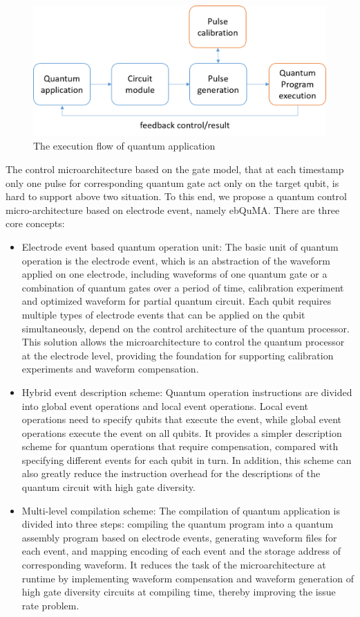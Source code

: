 \begin{figure}[ht]
  \centering
  \includegraphics[width=\linewidth]{figure/1}
  \caption{The execution flow of quantum application}
  \label{img}
\end{figure}

The control microarchitecture based on the gate model, that at each timestamp only one pulse for corresponding 
quantum gate act only on the target qubit, is hard to support above two situation. To this end, we propose a quantum control 
micro-architecture based on electrode event, namely ebQuMA. There are three core concepts:
\begin{itemize}
  \item Electrode event based quantum operation unit: The basic unit of quantum operation is the electrode event, which is an abstraction of the waveform applied on one electrode, 
  including waveforms of one quantum gate or a combination of quantum gates over a period of time, 
  calibration experiment and optimized waveform for partial quantum circuit. 
  Each qubit requires multiple types of electrode events that can be applied on the qubit simultaneously, depend on the control architecture of the quantum processor. 
  This solution allows the microarchitecture to control the quantum processor at the electrode level, providing the foundation for supporting calibration experiments and waveform compensation. 
  \item Hybrid event description scheme: Quantum operation instructions are divided into global event 
  operations and local event operations. Local event operations need to specify qubits that execute the event, while global 
  event operations execute the event on all qubits. It provides a simpler description scheme for quantum operations that 
  require compensation, compared with specifying different events for each qubit in turn. In addition, this scheme can 
  also greatly reduce the instruction overhead for the descriptions of the quantum circuit with high gate diversity.
  \item Multi-level compilation scheme: The compilation of quantum application is divided into three steps: compiling 
  the quantum program into a quantum assembly program based on electrode events, generating waveform files for each event, 
  and mapping encoding of each event and the storage address of corresponding waveform. It reduces the task of the 
  microarchitecture at runtime by implementing waveform compensation and waveform generation of high gate diversity 
  circuits at compiling time, thereby improving the issue rate problem.
\end{itemize}

